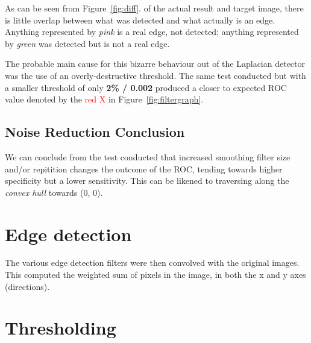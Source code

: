 \documentclass[a4paper]{article}
\newenvironment{floatfig}
  {\par\medskip\noindent\minipage{\linewidth}}
  {\endminipage\par\medskip}
\begin{document}
\begin{multicols*}{2}
\begin{floatfig}
    \centering
\end{floatfig}

As can be seen from Figure~\ref{fig:diff}. of the actual result and target image, there is little overlap between what was detected and what actually is an edge. Anything represented by \emph{pink} is a real edge, not detected; anything represented by \emph{green} was detected but is not a real edge.

The probable main cause for this bizarre behaviour out of the Laplacian detector was the use of an overly-destructive threshold. The same test conducted but with a smaller threshold of only \textbf{2\% / 0.002} produced a closer to expected ROC value denoted by the \textcolor{red}{red X} in Figure~\ref{fig:filtergraph}.

\subsection*{Noise Reduction Conclusion}
We can conclude from the test conducted that increased smoothing filter size and/or repitition changes the outcome of the ROC, tending towards higher specificity but a lower sensitivity. This can be likened to traversing along the \emph{convex hull} towards (0, 0).

\section*{Edge detection}

The various edge detection filters were then convolved with the original images. This computed the weighted sum of pixels in the image, in both the x and y axes (directions).

\section*{Thresholding}


\end{multicols*}
\end{document}
